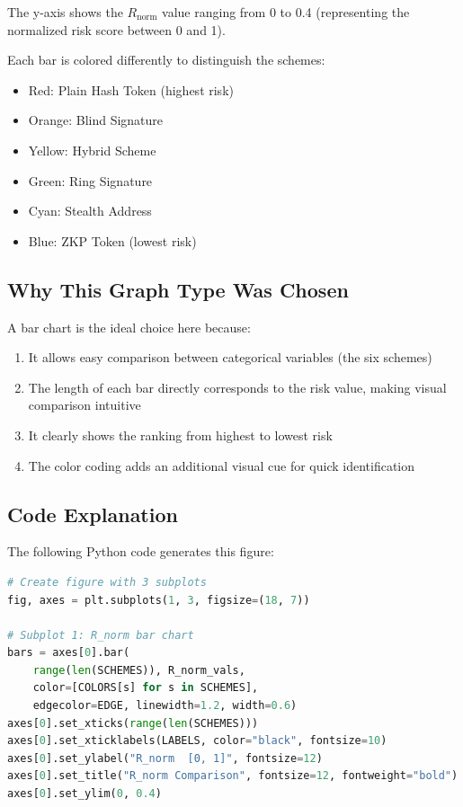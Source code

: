 \documentclass[12pt,a4paper,oneside,openany]{report}
\begin{document}
The y-axis shows the $R_{\mathrm{norm}}$ value ranging from 0 to 0.4 (representing the normalized risk score between 0 and 1).

Each bar is colored differently to distinguish the schemes:
\begin{itemize}
    \item Red: Plain Hash Token (highest risk)
    \item Orange: Blind Signature
    \item Yellow: Hybrid Scheme
    \item Green: Ring Signature
    \item Cyan: Stealth Address
    \item Blue: ZKP Token (lowest risk)
\end{itemize}

\subsection{Why This Graph Type Was Chosen}
A bar chart is the ideal choice here because:
\begin{enumerate}
    \item It allows easy comparison between categorical variables (the six schemes)
    \item The length of each bar directly corresponds to the risk value, making visual comparison intuitive
    \item It clearly shows the ranking from highest to lowest risk
    \item The color coding adds an additional visual cue for quick identification
\end{enumerate}

\subsection{Code Explanation}
The following Python code generates this figure:

\begin{lstlisting}[language=Python]
# Create figure with 3 subplots
fig, axes = plt.subplots(1, 3, figsize=(18, 7))

# Subplot 1: R_norm bar chart
bars = axes[0].bar(
    range(len(SCHEMES)), R_norm_vals,
    color=[COLORS[s] for s in SCHEMES],
    edgecolor=EDGE, linewidth=1.2, width=0.6)
axes[0].set_xticks(range(len(SCHEMES)))
axes[0].set_xticklabels(LABELS, color="black", fontsize=10)
axes[0].set_ylabel("R_norm  [0, 1]", fontsize=12)
axes[0].set_title("R_norm Comparison", fontsize=12, fontweight="bold")
axes[0].set_ylim(0, 0.4)
\end{lstlisting}
\end{document}
